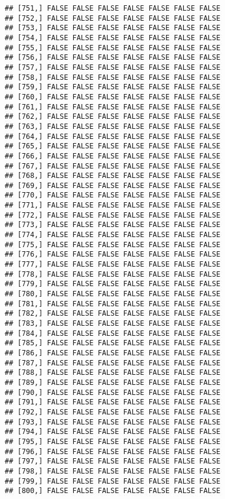 \documentclass[
]{article}
\begin{document}
\begin{verbatim}
## [751,] FALSE FALSE FALSE FALSE FALSE FALSE FALSE
## [752,] FALSE FALSE FALSE FALSE FALSE FALSE FALSE
## [753,] FALSE FALSE FALSE FALSE FALSE FALSE FALSE
## [754,] FALSE FALSE FALSE FALSE FALSE FALSE FALSE
## [755,] FALSE FALSE FALSE FALSE FALSE FALSE FALSE
## [756,] FALSE FALSE FALSE FALSE FALSE FALSE FALSE
## [757,] FALSE FALSE FALSE FALSE FALSE FALSE FALSE
## [758,] FALSE FALSE FALSE FALSE FALSE FALSE FALSE
## [759,] FALSE FALSE FALSE FALSE FALSE FALSE FALSE
## [760,] FALSE FALSE FALSE FALSE FALSE FALSE FALSE
## [761,] FALSE FALSE FALSE FALSE FALSE FALSE FALSE
## [762,] FALSE FALSE FALSE FALSE FALSE FALSE FALSE
## [763,] FALSE FALSE FALSE FALSE FALSE FALSE FALSE
## [764,] FALSE FALSE FALSE FALSE FALSE FALSE FALSE
## [765,] FALSE FALSE FALSE FALSE FALSE FALSE FALSE
## [766,] FALSE FALSE FALSE FALSE FALSE FALSE FALSE
## [767,] FALSE FALSE FALSE FALSE FALSE FALSE FALSE
## [768,] FALSE FALSE FALSE FALSE FALSE FALSE FALSE
## [769,] FALSE FALSE FALSE FALSE FALSE FALSE FALSE
## [770,] FALSE FALSE FALSE FALSE FALSE FALSE FALSE
## [771,] FALSE FALSE FALSE FALSE FALSE FALSE FALSE
## [772,] FALSE FALSE FALSE FALSE FALSE FALSE FALSE
## [773,] FALSE FALSE FALSE FALSE FALSE FALSE FALSE
## [774,] FALSE FALSE FALSE FALSE FALSE FALSE FALSE
## [775,] FALSE FALSE FALSE FALSE FALSE FALSE FALSE
## [776,] FALSE FALSE FALSE FALSE FALSE FALSE FALSE
## [777,] FALSE FALSE FALSE FALSE FALSE FALSE FALSE
## [778,] FALSE FALSE FALSE FALSE FALSE FALSE FALSE
## [779,] FALSE FALSE FALSE FALSE FALSE FALSE FALSE
## [780,] FALSE FALSE FALSE FALSE FALSE FALSE FALSE
## [781,] FALSE FALSE FALSE FALSE FALSE FALSE FALSE
## [782,] FALSE FALSE FALSE FALSE FALSE FALSE FALSE
## [783,] FALSE FALSE FALSE FALSE FALSE FALSE FALSE
## [784,] FALSE FALSE FALSE FALSE FALSE FALSE FALSE
## [785,] FALSE FALSE FALSE FALSE FALSE FALSE FALSE
## [786,] FALSE FALSE FALSE FALSE FALSE FALSE FALSE
## [787,] FALSE FALSE FALSE FALSE FALSE FALSE FALSE
## [788,] FALSE FALSE FALSE FALSE FALSE FALSE FALSE
## [789,] FALSE FALSE FALSE FALSE FALSE FALSE FALSE
## [790,] FALSE FALSE FALSE FALSE FALSE FALSE FALSE
## [791,] FALSE FALSE FALSE FALSE FALSE FALSE FALSE
## [792,] FALSE FALSE FALSE FALSE FALSE FALSE FALSE
## [793,] FALSE FALSE FALSE FALSE FALSE FALSE FALSE
## [794,] FALSE FALSE FALSE FALSE FALSE FALSE FALSE
## [795,] FALSE FALSE FALSE FALSE FALSE FALSE FALSE
## [796,] FALSE FALSE FALSE FALSE FALSE FALSE FALSE
## [797,] FALSE FALSE FALSE FALSE FALSE FALSE FALSE
## [798,] FALSE FALSE FALSE FALSE FALSE FALSE FALSE
## [799,] FALSE FALSE FALSE FALSE FALSE FALSE FALSE
## [800,] FALSE FALSE FALSE FALSE FALSE FALSE FALSE

\end{verbatim}
\end{document}
